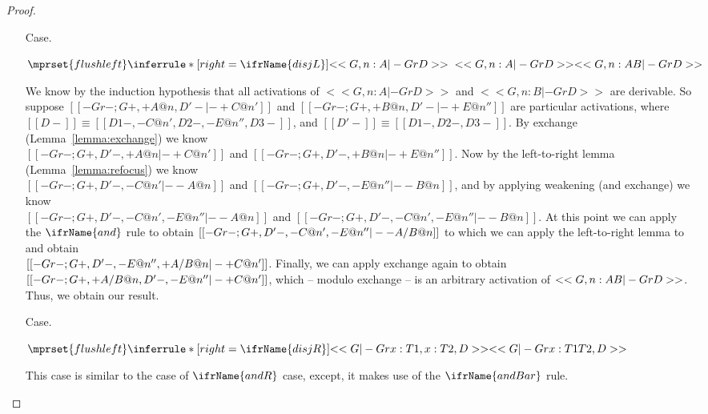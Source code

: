 \begin{proof}
\begin{itemize}
  \item[Case.]\ \\ 
    \begin{center}
      \begin{math}
        $$\mprset{flushleft}
        \inferrule* [right=\ifrName{disjL}] {
          <<G, n : A |- Gr D>>
          \\\\
          <<G, n : A |- Gr D>>
        }{<<G, n : A \/ B |- Gr D>>}
      \end{math}
    \end{center}
    We know by the induction hypothesis that all activations of $<<G, n : A |- Gr D>>$ and
    $<<G, n : B |- Gr D>>$ are derivable.  So suppose $[[-Gr-; {G}+,+{A}@n,{D'}- |- + C @ n']]$ and
    $[[-Gr-; {G}+,+{B}@n,{D'}- |- + E @ n'']]$ are particular activations, 
    where $[[{D}-]] \equiv [[{D1}-,-C@n',{D2}-,-E@n'',{D3}-]]$, and $[[{D'}-]] \equiv [[{D1}-,{D2}-,{D3}-]]$.
    By exchange (Lemma~\ref{lemma:exchange}) we know \\
    $[[-Gr-; {G}+,{D'}-,+{A}@n |- + C @ n']]$ 
    and  $[[-Gr-; {G}+,{D'}-,+{B}@n |- + E @ n'']]$.  Now by the left-to-right lemma (Lemma~\ref{lemma:refocus}) we know \\
    $[[-Gr-; {G}+,{D'}-, - C @ n' |- -{A}@n]]$ and $[[-Gr-; {G}+,{D'}-, - E @ n'' |- -{B}@n]]$, and by applying
    weakening (and exchange) we know \\ $[[-Gr-; {G}+,{D'}-, - C @ n', - E @ n'' |- -{A}@n]]$ and 
    $[[-Gr-; {G}+,{D'}-, -C@n',- E @ n'' |- -{B}@n]]$.  At this point we can apply 
    the $\ifrName{and}$ rule to obtain $[[-Gr-; {G}+,{D'}-, - C @ n',- E @ n'' |- - {A} /\- {B} @ n]]$ to which we can apply
    the left-to-right lemma to and obtain \\
    $[[-Gr-; {G}+,{D'}-,- E @ n'',+ {A} /\- {B} @ n |- + C @ n']]$.  Finally, we can apply 
    exchange again to obtain $[[-Gr-; {G}+, + {A} /\- {B} @ n, {D'}-,- E @ n'' |- + C @ n']]$, which -- modulo exchange -- is
    an arbitrary activation of $<<G, n : A \/ B |- Gr D>>$.   Thus, we obtain our result.
    

  \item[Case.]\ \\ 
    \begin{center}
      \begin{math}
        $$\mprset{flushleft}
        \inferrule* [right=\ifrName{disjR}] {
          <<G |- Gr x : T1, x : T2, D>>
        }{<<G |- Gr x : T1 \/ T2, D>>}
      \end{math}
    \end{center}
    This case is similar to the case of $\ifrName{andR}$ case, except,
    it makes use of the $\ifrName{andBar}$ rule.


\end{itemize}
\end{proof}

